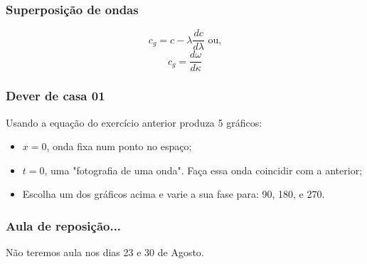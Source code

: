 \begin{frame}
\frametitle{Superposição de ondas}
    \begin{block}{}
        \begin{center}
            \[
                c_g = c - \lambda \frac{dc}{d\lambda} \text{ ou,}
            \]
            \[
                c_g = \frac{d\omega}{d\kappa}
            \]
        \end{center}
    \end{block}
\end{frame}

\begin{frame}
\frametitle{Dever de casa 01}
    \begin{block}{}
        Usando a equação do exercício anterior produza 5 gráficos:
        \begin{itemize}
            \item $x = 0$, onda fixa num ponto no espaço;
            \item $t = 0$, uma "fotografia de uma onda".  Faça essa onda
                  coincidir com a anterior;
            \item Escolha um dos gráficos acima e varie a sua fase para:
                  90\textdegree{}, 180\textdegree{}, e 270\textdegree{}.
        \end{itemize}
    \end{block}
\end{frame}

\begin{frame}
\frametitle{Aula de reposição...}
    \begin{block}{}
        Não teremos aula nos dias 23 e 30 de Agosto.
    \end{block}
\end{frame}



